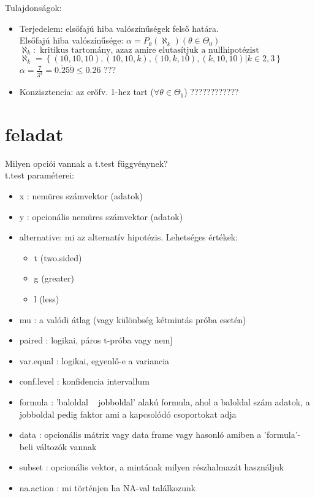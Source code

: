 \documentclass[]{article}
\begin{document}
Tulajdons\'agok:
\begin{itemize}
	\item Terjedelem: elsőfajú hiba valószínűségek felső
	határa. \\
	Els\H ofaj\'u hiba valószínűsége: $\alpha = P_\theta(\aleph_k) (\theta \in \Theta_0)$ \\
	$\aleph_k:\text{ kritikus tartom\'any, azaz amire elutas\'itjuk a nullhipot\'ezist} $\\ 
	$\aleph_k= \left\{ (10,10,10), (10,10,k), (10,k,10), (k,10,10) | k\in {2,3} \right\}$ \\
	$\alpha = \frac{7}{3^3} = 0.\dot 2 5 \dot 9  \le 0.26 $ ???
	
	\item Konzisztencia: az erőfv. 1-hez tart ($\forall \theta \in \Theta_1$) ????????????
\end{itemize}


\section{feladat}
Milyen opciói vannak a t.test függvénynek? \\
t.test param\'eterei:
\begin{itemize}
	\item x : nem\"ures sz\'amvektor (adatok)
	\item y : opcion\'alis nem\"ures sz\'amvektor (adatok)
	\item alternative: mi az alternat\'iv hipot\'ezis. Lehets\'eges \'ert\'ekek:
	\begin{itemize}
		\item t (two.sided)
		\item g (greater)
		\item l (less)
	\end{itemize}
	\item mu : a val\'odi \'atlag (vagy k\"ul\"onbs\'eg k\'etmint\'as pr\'oba eset\'en)
	\item paired : logikai, p\'aros t-pr\'oba vagy nem]
	\item var.equal : logikai, egyenl\H o-e a variancia
	\item conf.level : konfidencia intervallum
	\item formula : 'baloldal ~ jobboldal' alak\'u formula, ahol a baloldal sz\'am adatok, a jobboldal pedig faktor ami a kapcsol\'od\'o csoportokat adja
	\item data : opcion\'alis m\'atrix vagy data frame vagy hasonl\'o amiben a 'formula'-beli v\'altoz\'ok vannak
	\item subset : opcion\'alis vektor, a mint\'anak milyen r\'eszhalmaz\'at haszn\'aljuk
	\item na.action : mi t\"ort\'enjen ha NA-val tal\'alkozunk
\end{itemize}
\end{document}
